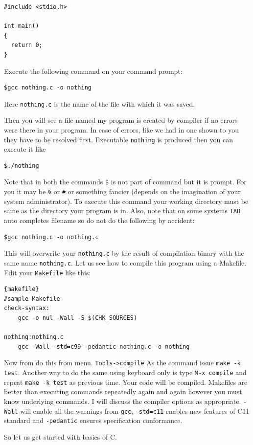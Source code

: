 \begin{Verbatim}[frame=single]
#include <stdio.h>

int main()
{
  return 0;
}
\end{Verbatim}

Execute the following command on your command prompt:

\begin{Verbatim}[frame=single]
$gcc nothing.c -o nothing
\end{Verbatim}
Here \texttt{nothing.c} is the name of the file with which it was saved.

Then you will see a file named my program is created by compiler if no errors
were there in your program. In case of errors, like we had in one shown to you
they have to be resolved first. Executable \texttt{nothing} is produced then
you can execute it like

\begin{Verbatim}[frame=single]
$./nothing
\end{Verbatim}

Note that in both the commands \texttt{\$} is not part of command but it is
prompt. For you it may be \texttt{\%} or \texttt{\#} or something fancier
(depends on the imagination of your system administrator). To execute this
command your working directory must be same as the directory your program is
in. Also, note that on some systems \texttt{TAB} auto completes filename so do
not do the following by accident:

\color{nicered}
\begin{Verbatim}[frame=single]
$gcc nothing.c -o nothing.c
\end{Verbatim}
\color{black}
This will overwrite your \texttt{nothing.c} by the result of compilation binary
with the same name \texttt{nothing.c}. Let us see how to compile this program
using a Makefile. Edit your \texttt{Makefile} like this:

\begin{Verbatim}[frame=single]{makefile}
#sample Makefile
check-syntax:
    gcc -o nul -Wall -S $(CHK_SOURCES)

nothing:nothing.c
    gcc -Wall -std=c99 -pedantic nothing.c -o nothing
\end{Verbatim}

Now from do this from menu. \texttt{Tools->compile} As the command issue
\texttt{make -k test}. Another way to do the same using keyboard only is type
\texttt{M-x compile} and repeat \texttt{make -k test} as previous time. Your
code will be compiled. Makefiles are better than executing commands 
repeatedly again and again however you must know underlying commands. I will
discuss the compiler options as appropriate. \texttt{-Wall} will enable all the
warnings from \texttt{gcc}, \texttt{-std=c11} enables new features of C11
standard and \texttt{-pedantic} ensures specification conformance. 

So let us get started with basics of C.
